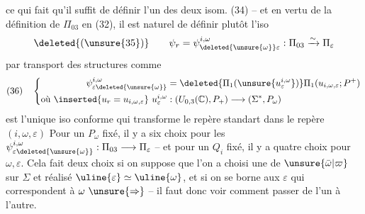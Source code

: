 ce qui fait qu'il suffit de définir l'un des deux isom. (34) -- et en vertu de la définition de $\Pi_{03}$ en (32), il est naturel de définir plutôt l'iso
\[
\deleted{(\unsure{35})}\qquad\psi_r=\psi_{\deleted{\unsure{\omega}}\varepsilon}^{i,\omega}:\Pi_{03}\xrightarrow{\sim}\Pi_\varepsilon
\]
par transport des structures comme
\[
(36)\quad\left\{\begin{aligned}
\psi_{\varepsilon\deleted{\unsure{\omega}}}^{i,\omega}&=\deleted{\Pi_1(\unsure{u_\varepsilon^{i,\omega}})}\Pi_1(u_{i,\omega,\varepsilon};P^+)\\
\text{où }\inserted{u_r=u_{i,\omega,\varepsilon}}\ u_\varepsilon^{i,\omega}&:(U_{0,3}(\mathbb C),P_+)\longrightarrow(\Sigma^*,P_\omega)
\end{aligned}\right.
\]
est l'unique iso conforme qui transforme le repère  standart   dans le repère  $(i,\omega,\varepsilon)$
Pour un $P_\omega$ fixé, il y a six choix pour les  $\psi_{\varepsilon\deleted{\unsure{\omega}}}^{i,\omega}:\Pi_{03}\longrightarrow\Pi_\varepsilon$ -- et pour un $Q_i$ fixé, il y a quatre choix pour $\omega,\varepsilon$. Cela fait  deux choix si on suppose que l'on a choisi une  de $\unsure{\bar\omega|\varpi}$ sur $\Sigma$ et réalisé  $\uline{\varepsilon}\simeq\uline{\omega}$, et si on se borne aux $\varepsilon$ qui correspondent à $\omega\ \unsure{\Rightarrow}$ -- il faut donc voir comment passer de l'un  à l'autre.

